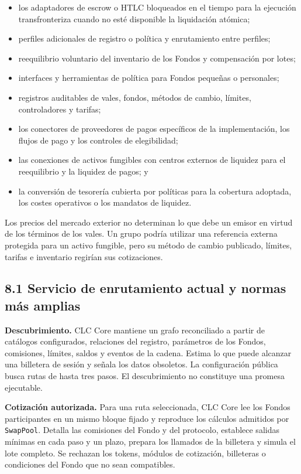 \documentclass[11pt]{article}
\begin{document}
\begin{itemize}[leftmargin=*]
\item los adaptadores de escrow o HTLC bloqueados en el tiempo para la ejecución transfronteriza cuando no esté disponible la liquidación atómica;
\item perfiles adicionales de registro o política y enrutamiento entre perfiles;
\item reequilibrio voluntario del inventario de los Fondos y compensación por lotes;
\item interfaces y herramientas de política para Fondos pequeñas o personales;
\item registros auditables de vales, fondos, métodos de cambio, límites, controladores y tarifas;
\item los conectores de proveedores de pagos específicos de la implementación, los flujos de pago y los controles de elegibilidad;
\item las conexiones de activos fungibles con centros externos de liquidez para el reequilibrio y la liquidez de pagos; y
\item la conversión de tesorería cubierta por políticas para la cobertura adoptada, los costes operativos o los mandatos de liquidez.
\end{itemize}
Los precios del mercado exterior no determinan lo que debe un emisor en virtud de los términos de los vales. Un grupo podría utilizar una referencia externa protegida para un activo fungible, pero su método de cambio publicado, límites, tarifas e inventario regirían sus cotizaciones.

\subsection*{8.1 Servicio de enrutamiento actual y normas más amplias}

\textbf{Descubrimiento.} CLC Core mantiene un grafo reconciliado a partir de catálogos configurados, relaciones del registro, parámetros de los Fondos, comisiones, límites, saldos y eventos de la cadena. Estima lo que puede alcanzar una billetera de sesión y señala los datos obsoletos. La configuración pública busca rutas de hasta tres pasos. El descubrimiento no constituye una promesa ejecutable.

\textbf{Cotización autorizada.} Para una ruta seleccionada, CLC Core lee los Fondos participantes en un mismo bloque fijado y reproduce los cálculos admitidos por \texttt{SwapPool}. Detalla las comisiones del Fondo y del protocolo, establece salidas mínimas en cada paso y un plazo, prepara los llamados de la billetera y simula el lote completo. Se rechazan los tokens, módulos de cotización, billeteras o condiciones del Fondo que no sean compatibles.
\end{document}
